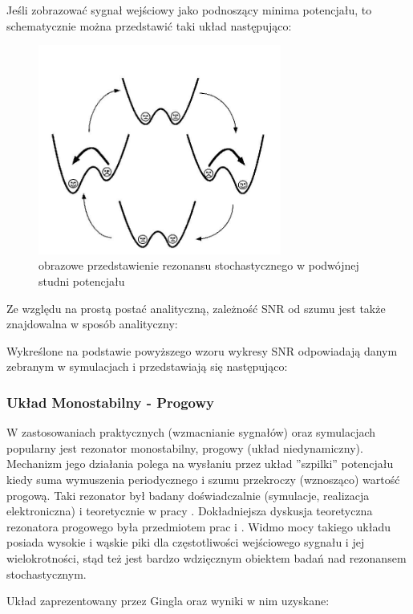   Jeśli zobrazować sygnał wejściowy jako podnoszący minima potencjału, to schematycznie można przedstawić taki układ następująco:

  \begin{figure}
    \includegraphics[width=80mm]{images/sr.jpg}
    \caption{obrazowe przedstawienie rezonansu stochastycznego w podwójnej studni potencjału}
  \end{figure}


  Ze względu na prostą postać analityczną, zależność SNR od szumu jest także znajdowalna w sposób analityczny:

  Wykreślone na podstawie powyższego wzoru wykresy SNR odpowiadają danym zebranym w symulacjach i przedstawiają się następująco:



  \subsubsection{Układ Monostabilny - Progowy}

  W zastosowaniach praktycznych (wzmacnianie sygnałów) oraz symulacjach popularny jest rezonator monostabilny, progowy (układ niedynamiczny). Mechanizm jego działania polega na wysłaniu przez układ ''szpilki'' potencjału kiedy suma wymuszenia periodycznego i szumu przekroczy (wznosząco) wartość progową. Taki rezonator był badany doświadczalnie (symulacje, realizacja elektroniczna) i teoretycznie w pracy \cite{gingl_kiss_moss}. Dokładniejsza dyskusja teoretyczna rezonatora progowego była przedmiotem prac \cite{blondeau_e53} i \cite{blondeau_e55}. Widmo mocy takiego układu posiada wysokie i wąskie piki dla częstotliwości wejściowego sygnału i jej wielokrotności, stąd też jest bardzo wdzięcznym obiektem badań nad rezonansem stochastycznym. 

  Układ zaprezentowany przez Gingla \cite{gingl_kiss_moss} oraz wyniki w nim uzyskane:

